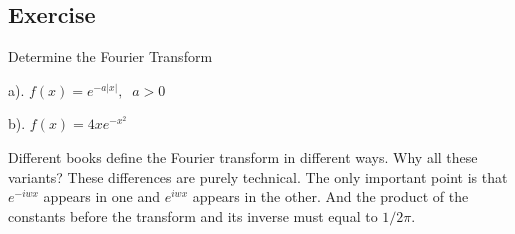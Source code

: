 \message{ !name(ch3_aima331.tex)}\documentclass[aima331_lecturenotes_ku.tex]{subfiles}
\begin{document}
 \subsection{Exercise}
 Determine the Fourier Transform
   \begin{multicols}{2}
     a). $f(x)=e^{-a|x|}, \;\; a>0$
     \columnbreak

     b). $f(x) = 4xe^{-x^2}$
   \end{multicols}
   \begin{remark}
     Different books define the Fourier transform in different ways. Why all these variants? These differences are purely technical. The only important point is that $e^{-iwx}$ appears in one and $e^{iwx}$ appears in the other. And the product of the constants before the transform and its inverse must equal to $1/2\pi$.
   \end{remark}
\end{document}
